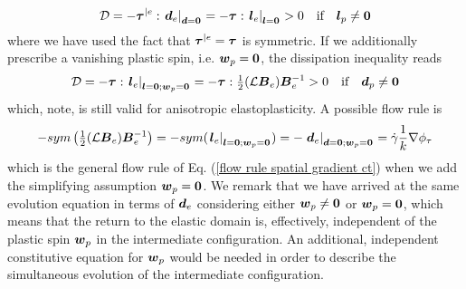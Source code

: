 \documentclass[preprint,review,12pt,sort&compress]{elsarticle}%
\newcommand{\lo}[0]{\scriptsize\mathbf{l} = \mathbf{0}\normalsize\mathbf{}}
\newcommand{\doo}[0]{\scriptsize\mathbf{d} = \mathbf{0}\normalsize\mathbf{}}
\newcommand{\lowpo}[0]{\scriptsize\mathbf{l} = \mathbf{0}; \mathbf{w}_p = \mathbf{0}\normalsize\mathbf{}}
\newcommand{\dowpo}[0]{\scriptsize\mathbf{d} = \mathbf{0}; \mathbf{w}_p = \mathbf{0}\normalsize\mathbf{}}
\renewcommand{\mathbf}[1]{\mbox{\boldmath $#1$ \unboldmath}  \!\!}
\begin{document}
\begin{equation}
\mathcal{D}=-\mathbf{\tau}^{|e}:\left.  \mathbf{d}_{e}\right\vert _{%
\doo
}=-\mathbf{\tau}:\left.  \mathbf{l}_{e}\right\vert _{%
\lo
}>0\quad\text{if}\quad\mathbf{l}_{p}\neq\mathbf{0}%
\end{equation}
where we have used the fact that $\mathbf{\tau}^{|e}=\mathbf{\tau}$ is
symmetric. If we additionally prescribe a vanishing plastic spin, i.e.
$\mathbf{w}_{p}=\mathbf{0}$, the dissipation inequality reads%
\begin{equation}
\mathcal{D}=-\mathbf{\tau}:\left.  \mathbf{l}_{e}\right\vert _{%
\lowpo
}=-\mathbf{\tau}:\tfrac{1}{2}(\mathcal{L}\mathbf{B}_{e})\mathbf{B}_{e}%
^{-1}>0\quad\text{if}\quad\mathbf{d}_{p}\neq\mathbf{0}%
\end{equation}
which, note, is still valid for anisotropic elastoplasticity. A possible flow
rule is%
\begin{equation}
-sym\left(  \tfrac{1}{2}(\mathcal{L}\mathbf{B}_{e})\mathbf{B}_{e}^{-1}\right)
=-sym(\left.  \mathbf{l}_{e}\right\vert _{%
\lowpo
})=-\left.  \mathbf{d}_{e}\right\vert _{%
\dowpo
}=\dot{\gamma}\frac{1}{k}\mathbb{\nabla}\phi_{\tau}%
\end{equation}
which is the general flow rule of Eq. (\ref{flow rule spatial gradient ct})
when we add the simplifying assumption $\mathbf{w}_{p}=\mathbf{0}$. We remark
that we have arrived at the same evolution equation in terms of $\mathbf{d}%
_{e}$ considering either $\mathbf{w}_{p}\neq\mathbf{0}$ or $\mathbf{w}%
_{p}=\mathbf{0}$, which means that the return to the elastic domain is,
effectively, independent of the plastic spin $\mathbf{w}_{p}$ in the
intermediate configuration. An additional, independent constitutive equation
for $\mathbf{w}_{p}$ would be needed in order to describe the simultaneous
evolution of the intermediate configuration.
\end{document}
